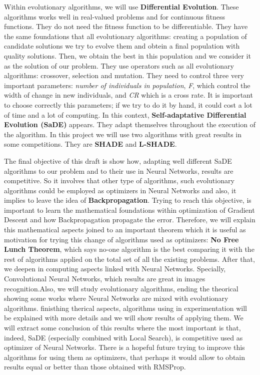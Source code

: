 \documentclass[../proyecto.tex]{book}
\begin{document}
  Within evolutionary algorithms, we will use \textbf{Differential Evolution}. These algorithms works well in real-valued problems and for continuous fitness functions. They do not need the fitness function to be differentiable. They have the same foundations that all evolutionary algorithms: creating a population of candidate solutions we try to evolve them and obtein a final population with quality solutions. Then, we obtain the best in this population and we consider it as the solution of our problem. They use operators such as all evolutionary algorithms: crossover, selection and mutation. They need to control three very important parameters: \textit{number of individuals in population}, \textit{F}, which control the width of change in new individuals, and \textit{CR} which is a cross rate. It is important to choose correctly this parameters; if we try to do it by hand, it could cost a lot of time and a lot of computing. In this context, \textbf{Self-adaptative Differential Evolution (SaDE)} appears. They adapt themselves throughout the execution of the algorithm. In this project we will use two algorithms with great results in some competitions. They are \textbf{SHADE} and \textbf{L-SHADE}.
  
  The final objective of this draft is show how, adapting well different SaDE algorithms to our problem and to their use in Neural Networks, results are competitive. So it involves that other type of algorithms, such evolutionary algorithms could be employed as optimizers in Neural Networks and also, it implies to leave the idea of \textbf{Backpropagation}. Trying to reach this objective, is important to learn the mathematical foundations within optimization of Gradient Descent and how Backpropagation propagate the error. Therefore, we will explain this mathematical aspects joined to an important theorem which it is useful as motivation for trying this change of algorithms used as optimizers: \textbf{No Free Lunch Theorem}, which says no-one algorithm is the best comparing it with the rest of  algorithms applied on the total set of all the existing problems.  After that, we deepen in computing aspects linked with Neural Networks. Specially, Convolutional Neural Networks, which results are great in images recognition.Also, we will study  evolutionary algorithms, ending the theorical showing some works where Neural Networks are mixed with evolutionary algorithms. finisthing therical aspects, algorithms using in experimentation will be explained with more details and we will show results of applying them. We will extract some conclusion of this results where the most important is that, indeed, SaDE (especially combined with Local Search), is competitive used as optimizer of Neural Networks. There is a hopeful future trying to improve this algorithms for using them as optimizers, that perhaps it would allow to obtain results equal or better than those obtained with RMSProp.

\newpage
\end{document}
